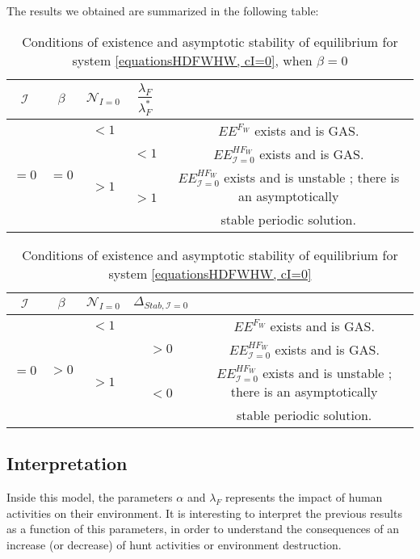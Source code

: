 \documentclass{article}
\newcommand{\lfw}{\lambda_{F}}
\newcommand{\lfw}{\lambda_{F}}
\newcommand{\cI}{\mathcal{I}}
\begin{document}
The results we obtained are summarized in the following table:
\begin{table}[!ht]
\centering
\def\arraystretch{2}
\begin{tabular}{c|c|c|c|c}
$\cI$ &$\beta$ & $\mathcal{N}_{I =0}$ &  $\dfrac{\lfw}{  \lfw ^*}$ & \\
\hline
\multirow{4}{*}{$=0$}&\multirow{4}{*}{$=0$} & $ < 1$ & &$EE^{F_W}$ exists and is GAS.  \\
\cline{3-5}
 & & \multirow{3}{*}{$> 1$} & $ <1$ &$EE^{HF_W}_{\cI=0}$ exists and is GAS.\\
 \cline{4-5}
 & & &\multirow{2}{*}{$ > 1$} & $EE^{HF_W}_{\cI=0}$ exists and is unstable ; there is an asymptotically \\
& & & &  stable periodic solution.
\end{tabular}
\caption{\centering Conditions of existence and asymptotic stability of equilibrium for system \eqref{equationsHDFWHW, cI=0}, when $\beta = 0$}
\end{table}


\begin{table}[!ht]
\centering
\def\arraystretch{2}
\begin{tabular}{c|c|c|c|c}
$\cI$ &$\beta$ & $\mathcal{N}_{I =0}$ &  $\Delta_{Stab, \cI =0}$ & \\
\hline
\multirow{4}{*}{$=0$}&\multirow{4}{*}{$>0$} & $ < 1$ & &$EE^{F_W}$ exists and is GAS.  \\
\cline{3-5}
 & & \multirow{3}{*}{$> 1$} & $ >0$ &$EE^{HF_W}_{\cI=0}$ exists and is GAS.\\
 \cline{4-5}
 & & &\multirow{2}{*}{$ <0 $} & $EE^{HF_W}_{\cI=0}$ exists and is unstable ; there is an asymptotically \\
& & & &  stable periodic solution.
\end{tabular}
\caption{\centering Conditions of existence and asymptotic stability of equilibrium for system \eqref{equationsHDFWHW, cI=0}}
\end{table}

\subsection{Interpretation}
Inside this model, the parameters $\alpha$ and $\lfw$ represents the impact of human activities on their environment. It is interesting to interpret the previous results as a function of this parameters, in order to understand the consequences of an increase (or decrease) of hunt activities or environment destruction.
\end{document}

